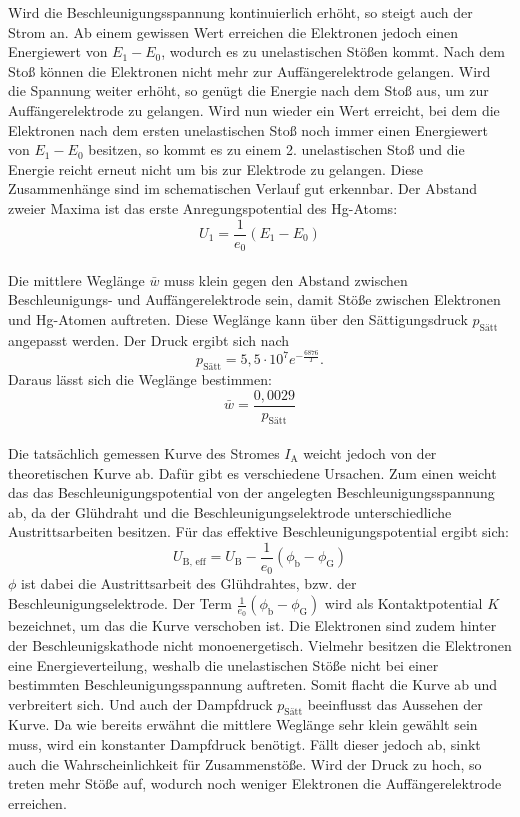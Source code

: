 Wird die Beschleunigungsspannung kontinuierlich erhöht, so steigt auch der Strom an. Ab einem gewissen Wert erreichen die Elektronen jedoch einen Energiewert von $E_1 - E_0$, wodurch es zu unelastischen Stö{\ss}en kommt. Nach dem Sto{\ss} können die Elektronen nicht mehr zur Auffängerelektrode gelangen. Wird die Spannung weiter erhöht, so genügt die Energie nach dem Sto{\ss} aus, um zur Auffängerelektrode zu gelangen. Wird nun wieder ein Wert erreicht, bei dem die Elektronen nach dem ersten unelastischen Sto{\ss} noch immer einen Energiewert von $E_1 - E_0$ besitzen, so kommt es zu einem 2. unelastischen Sto{\ss} und die Energie reicht erneut nicht um bis zur Elektrode zu gelangen. Diese Zusammenhänge sind im schematischen Verlauf gut erkennbar. 
Der Abstand zweier Maxima ist das erste Anregungspotential des Hg-Atoms:
\begin{equation}
	U_1 = \frac{1}{e_0}(E_1 - E_0)
\end{equation}
\\
Die mittlere Weglänge $\bar{w}$ muss klein gegen den Abstand zwischen Beschleunigungs- und Auffängerelektrode sein, damit Stö{\ss}e zwischen Elektronen und Hg-Atomen auftreten. Diese Weglänge kann über den Sättigungsdruck $p_\text{Sätt}$ angepasst werden. Der Druck ergibt sich nach
\begin{equation}
	p_\text{Sätt} = 5,5 \cdot 10^7 e^{-\frac{6876}{T}} .
\end{equation}
Daraus lässt sich die Weglänge bestimmen:
\begin{equation}
	\bar{w} = \frac{0,0029}{p_\text{Sätt}}
\end{equation}
\\
Die tatsächlich gemessen Kurve des Stromes $I_\text{A}$ weicht jedoch von der theoretischen Kurve ab. Dafür gibt es verschiedene Ursachen.
Zum einen weicht das das Beschleunigungspotential von der angelegten Beschleunigungsspannung ab, da der Glühdraht und die Beschleunigungselektrode unterschiedliche Austrittsarbeiten besitzen. Für das effektive Beschleunigungspotential ergibt sich:
\begin{equation}
	U_\text{B, eff} = U_\text{B} - \frac{1}{e_0} (\phi_\text{b} - \phi_\text{G})
\end{equation}
$\phi$ ist dabei die Austrittsarbeit des Glühdrahtes, bzw. der Beschleunigungselektrode. Der Term $\frac{1}{e_0} (\phi_\text{b} - \phi_\text{G})$ wird als Kontaktpotential $K$ bezeichnet, um das die Kurve verschoben ist. \*
Die Elektronen sind zudem hinter der Beschleunigskathode nicht monoenergetisch. Vielmehr besitzen die Elektronen eine Energieverteilung, weshalb die unelastischen Stö{\ss}e nicht bei einer bestimmten Beschleunigungsspannung auftreten. Somit flacht die Kurve ab und verbreitert sich. \*
Und auch der Dampfdruck $p_\text{Sätt}$ beeinflusst das Aussehen der Kurve. Da wie bereits erwähnt die mittlere Weglänge sehr klein gewählt sein muss, wird ein konstanter Dampfdruck benötigt. Fällt dieser jedoch ab, sinkt auch die Wahrscheinlichkeit für Zusammenstö{\ss}e. Wird der Druck zu hoch, so treten mehr Stö{\ss}e auf, wodurch noch weniger Elektronen die Auffängerelektrode erreichen.